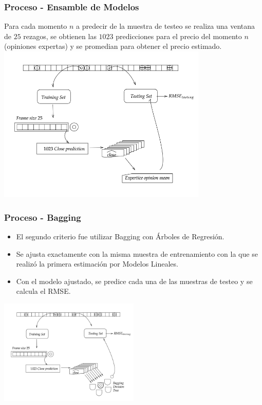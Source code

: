 \documentclass{beamer}
\begin{document}
\begin{frame}[t]
\frametitle{Proceso - Ensamble de Modelos}
\vfill
Para cada momento $n$ a predecir de la muestra de testeo se realiza una ventana de $25$ rezagos, se obtienen las $1023$ predicciones para el precio del momento $n$ (opiniones expertas) y se promedian para obtener el precio estimado.
\vfill
\centering
\includegraphics[width=0.75\textwidth]{diagramExpertMean}
\end{frame}

\begin{frame}[t]
\frametitle{Proceso - Bagging}
\vfill
\begin{itemize}
\item
El segundo criterio fue utilizar Bagging con Árboles de Regresión.
\item
Se ajusta exactamente con la misma muestra de entrenamiento con la que se realizó la primera estimación por Modelos Lineales. 
\item
Con el modelo ajustado, se predice cada una de las muestras de testeo y se calcula el RMSE. 
\end{itemize}
\vfill
\centering
\includegraphics[width=0.5\textwidth]{diagramBagging}
\end{frame}
\end{document}
